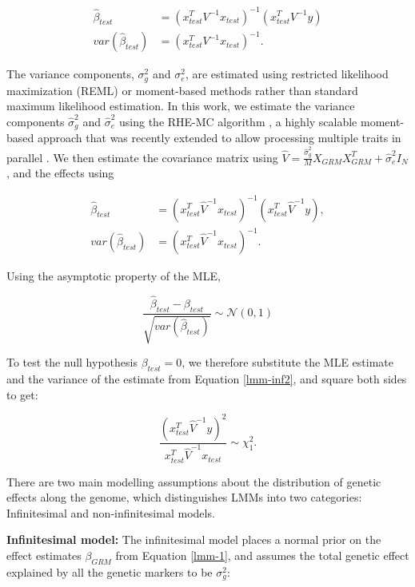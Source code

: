 \begin{align}
    \hat{\beta}_{test} &= (x_{test}^T V^{-1} x_{test})^{-1}(x_{test}^T V^{-1} y) \nonumber \\
    var(\hat{\beta}_{test}) &=(x_{test}^T V^{-1} x_{test})^{-1} \label{lmm-inf}.
\end{align}

%
The variance components, $\sigma_g^2$ and $\sigma_e^2$, are estimated using restricted likelihood maximization (REML) \cite{loh2015efficient} or moment-based methods \cite{wu2018scalable,pazokitoroudi2020efficient} rather than standard maximum likelihood estimation.
%
In this work, we estimate the variance components $\hat{\sigma}_g^2$ and $\hat{\sigma}_e^2$ using the RHE-MC algorithm \cite{wu2018scalable,pazokitoroudi2020efficient}, a highly scalable moment-based approach that was recently extended to allow processing multiple traits in parallel \cite{yiorgos2023,alma991025317822307026}.
%
We then estimate the covariance matrix using $\hat{V} = \frac{\hat{\sigma}_g^2}{M} X_{GRM}X_{GRM}^T + \hat{\sigma}_e^2 I_N$, and the effects using

\begin{align}
    \hat{\beta}_{test} &= (x_{test}^T \hat{V}^{-1} x_{test})^{-1}(x_{test}^T \hat{V}^{-1} y), \nonumber \\
    var(\hat{\beta}_{test}) &= (x_{test}^T \hat{V}^{-1} x_{test})^{-1} \label{lmm-inf2}.
\end{align}

%
Using the asymptotic property of the MLE, 

\begin{equation}
   \frac{\hat{\beta}_{test} - \beta_{test}}{\sqrt{var(\hat{\beta}_{test})}} \sim \mathcal{N}(0, 1) 
\end{equation}

%
To test the null hypothesis $\beta_{test} = 0$, we therefore substitute the MLE estimate and the variance of the estimate from Equation \ref{lmm-inf2}, and square both sides to get:

\begin{equation}
   \frac{(x_{test}^T \hat{V}^{-1} y)^2}{x_{test}^T \hat{V}^{-1} x_{test}} \sim \chi^2_1 \label{lmm-chi2}.
\end{equation}


There are two main modelling assumptions about the distribution of genetic effects along the genome, which distinguishes LMMs into two categories: Infinitesimal and non-infinitesimal models. 

%
\textbf{Infinitesimal model: }
%
The infinitesimal model places a normal prior on the effect estimates $\beta_{GRM}$ from Equation \ref{lmm-1}, and assumes the total genetic effect explained by all the genetic markers to be $\sigma_g^2$:
%

